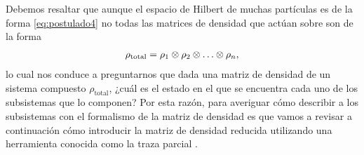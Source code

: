 
Debemos resaltar que aunque el espacio de Hilbert de muchas partículas 
es de la forma \eqref{eq:postulado4} no todas las matrices de densidad
que actúan sobre son de la forma 
\begin{align}
\rho_{\text{total}}=\rho_1\otimes \rho_2\otimes \ldots\otimes \rho_n,
\end{align}
lo cual nos conduce a preguntarnos que dada una matriz de densidad de
un sistema compuesto $\rho_{\text{total}}$, ¿cuál es el estado 
en el que se encuentra cada uno de los subsistemas que lo componen?
Por esta razón, para averiguar cómo describir a los subsistemas con 
el formalismo de la matriz de densidad es que vamos a revisar a continuación
cómo introducir la matriz de densidad reducida utilizando una herramienta
conocida como la traza parcial \cite{nielsen_chuang_2011}. 



